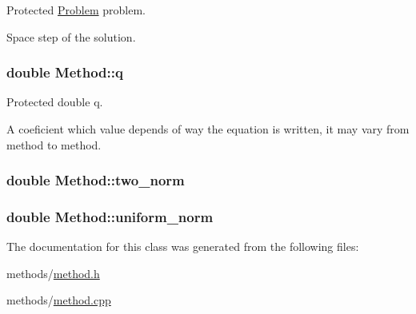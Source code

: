 Protected \hyperlink{classProblem}{Problem} problem. 

Space step of the solution. 
\subsubsection[{\texorpdfstring{q}{q}}]{\setlength{\rightskip}{0pt plus 5cm}double Method\+::q\hspace{0.3cm}{\ttfamily [protected]}}\hypertarget{classMethod_a794257d62bedf3691c3c0a2b921b8886}{}\label{classMethod_a794257d62bedf3691c3c0a2b921b8886}


Protected double q. 

A coeficient which value depends of way the equation is written, it may vary from method to method. 
\subsubsection[{\texorpdfstring{two\+\_\+norm}{two_norm}}]{\setlength{\rightskip}{0pt plus 5cm}double Method\+::two\+\_\+norm\hspace{0.3cm}{\ttfamily [private]}}\hypertarget{classMethod_ab1409405473f9c18be98f98fef471013}{}\label{classMethod_ab1409405473f9c18be98f98fef471013}
\subsubsection[{\texorpdfstring{uniform\+\_\+norm}{uniform_norm}}]{\setlength{\rightskip}{0pt plus 5cm}double Method\+::uniform\+\_\+norm\hspace{0.3cm}{\ttfamily [private]}}\hypertarget{classMethod_aa236db6acd86f4f88844892933faae80}{}\label{classMethod_aa236db6acd86f4f88844892933faae80}


The documentation for this class was generated from the following files\+:\begin{DoxyCompactItemize}
\item 
methods/\hyperlink{method_8h}{method.\+h}\item 
methods/\hyperlink{method_8cpp}{method.\+cpp}\end{DoxyCompactItemize}
